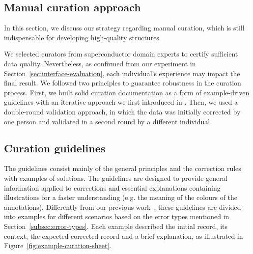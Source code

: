 \subsection{Manual curation approach}
\label{sec:data-correction}
\label{subsec:manual_correction}

In this section, we discuss our strategy regarding manual curation, which is still indispensable for developing high-quality structures. 

We selected curators from superconductor domain experts to certify sufficient data quality. 
Nevertheless, as confirmed from our experiment in Section~\ref{sec:interface-evaluation}, each individual's experience may impact the final result.
We followed two principles to guarantee robustness in the curation process. 
First, we built solid curation documentation as a form of example-driven guidelines with an iterative approach we first introduced in \cite{foppiano2021supermat}. 
Then, we used a double-round validation approach, in which the data was initially corrected by one person and validated in a second round by a different individual. 


\subsection{Curation guidelines}
\label{subsec:curation-guidelines}

The guidelines consist mainly of the general principles and the correction rules with examples of solutions.
The guidelines are designed to provide general information applied to corrections and essential explanations containing illustrations for a faster understanding (e.g. the meaning of the colours of the annotations). 
Differently from our previous work~\cite{foppiano2021supermat}, these guidelines are divided into examples for different scenarios based on the error types mentioned in Section~\ref{subsec:error-types}.
Each example described the initial record, its context, the expected corrected record and a brief explanation, as illustrated in Figure~\ref{fig:example-curation-sheet}. 

